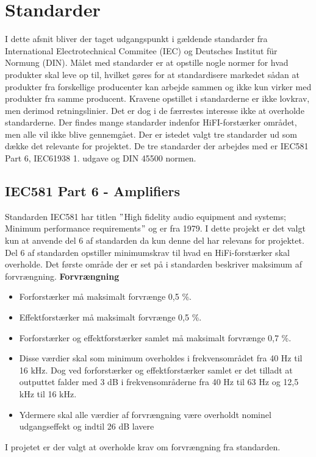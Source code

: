 \section{Standarder}
\label{standarder}
I dette afsnit bliver der taget udgangspunkt i gældende standarder fra International Electrotechnical Commitee (IEC) og Deutsches Institut f\"{u}r Normung (DIN). Målet med standarder er at opstille nogle normer for hvad produkter skal leve op til, hvilket gøres for at standardisere markedet sådan at produkter fra forskellige producenter kan arbejde sammen og ikke kun virker med produkter fra samme producent. Kravene opstillet i standarderne er ikke lovkrav, men derimod retningslinier. Det er dog i de færrestes interesse ikke at overholde standarderne.
\newline
\newline
Der findes mange standarder indenfor HiFI-forstærker området, men alle vil ikke blive gennemgået. Der er istedet valgt tre standarder ud som dække det relevante for projektet. De tre standarder der arbejdes med er IEC581 Part 6, IEC61938 1. udgave og DIN 45500 normen. 

\subsection*{IEC581 Part 6 - Amplifiers}
\label{IEC581}
Standarden IEC581 har titlen $"$High fidelity audio equipment and systems; Minimum performance requirements$"$ og er fra 1979. I dette projekt er det valgt kun at anvende del 6 af standarden da kun denne del har relevans for projektet. Del 6 af standarden opstiller minimumskrav til hvad en HiFi-forstærker skal overholde. \cite{IEC581-6}%
\newline
\newline
Det første område der er set på i standarden beskriver maksimum af forvrængning.
\newline 
\newline
\textbf{Forvrængning}
\begin{itemize}
\item Forforstærker må maksimalt forvrænge 0,5 \%.
\item Effektforstærker må maksimalt forvrænge 0,5 \%.
\item Forforstærker og effektforstærker samlet må maksimalt forvrænge 0,7 \%.
\item Disse værdier skal som minimum overholdes i frekvensområdet fra 40 Hz til 16 kHz. Dog ved forforstærker og effektforstærker samlet er det tilladt at outputtet falder med 3 dB i frekvensområderne fra 40 Hz til 63 Hz og 12,5 kHz til 16 kHz. 
\item Ydermere skal alle værdier af forvrængning være overholdt nominel udgangseffekt og indtil 26 dB lavere 
\end{itemize}
I projetet er der valgt at overholde krav om forvrængning fra standarden. 


